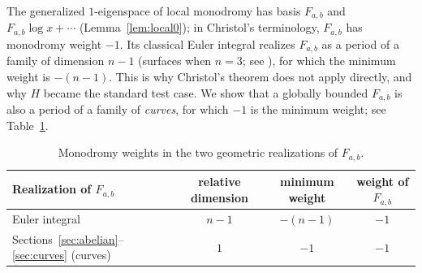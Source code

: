 \documentclass[11pt]{amsart}
\theoremstyle{definition}
\theoremstyle{remark}
\numberwithin{equation}{section}
\newcommand{\Fab}{F_{a,b}}
\begin{document}
The generalized $1$-eigenspace of local monodromy has basis $\Fab$ and $\Fab\log x+\cdots$ (Lemma~\ref{lem:local0}); in Christol's terminology, $\Fab$ has monodromy weight $-1$. Its classical Euler integral realizes $\Fab$ as a period of a family of dimension $n-1$ (surfaces when $n=3$; see \citep[\S4.3]{Christol2015}), for which the minimum weight is $-(n-1)$. This is why Christol's theorem does not apply directly, and why $H$ became the standard test case. We show that a globally bounded $\Fab$ is also a period of a family of \emph{curves}, for which $-1$ is the minimum weight; see Table~\ref{tab:weights}.

\begin{table}[ht]
\centering
\begin{tabular}{lccc}
\toprule
Realization of $\Fab$ & relative dimension & minimum weight & weight of $\Fab$\\
\midrule
Euler integral & $n-1$ & $-(n-1)$ & $-1$\\
Sections~\ref{sec:abelian}--\ref{sec:curves} (curves) & $1$ & $-1$ & $-1$\\
\bottomrule
\end{tabular}
\medskip
\caption{Monodromy weights in the two geometric realizations of $\Fab$.}\label{tab:weights}
\end{table}
\end{document}
